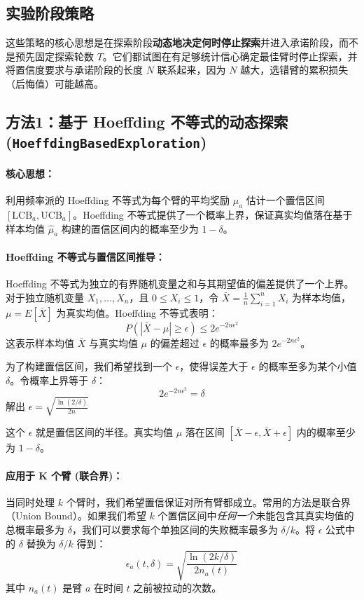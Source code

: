 \documentclass[8pt, a4paper]{ctexart} %
\begin{document}
\subsection{实验阶段策略}

这些策略的核心思想是在探索阶段\textbf{动态地决定何时停止探索}并进入承诺阶段，而不是预先固定探索轮数 $T$。它们都试图在有足够统计信心确定最佳臂时停止探索，并将置信度要求与承诺阶段的长度 $N$ 联系起来，因为 $N$ 越大，选错臂的累积损失（后悔值）可能越高。

\subsection{方法1：基于 Hoeffding 不等式的动态探索 (\texttt{HoeffdingBasedExploration})}

\paragraph{核心思想：} 利用频率派的 Hoeffding 不等式为每个臂的平均奖励 $\mu_a$ 估计一个置信区间 $[\text{LCB}_a, \text{UCB}_a]$。Hoeffding 不等式提供了一个概率上界，保证真实均值落在基于样本均值 $\hat{\mu}_a$ 构建的置信区间内的概率至少为 $1-\delta$。

\paragraph{Hoeffding 不等式与置信区间推导：}
Hoeffding 不等式为独立的有界随机变量之和与其期望值的偏差提供了一个上界。对于独立随机变量 $X_1, \dots, X_n$，且 $0 \le X_i \le 1$，令 $\bar{X} = \frac{1}{n}\sum_{i=1}^n X_i$ 为样本均值，$\mu = E[\bar{X}]$ 为真实均值。Hoeffding 不等式表明：
$$P(|\bar{X} - \mu| \ge \epsilon) \le 2e^{-2n\epsilon^2}$$
这表示样本均值 $\bar{X}$ 与真实均值 $\mu$ 的偏差超过 $\epsilon$ 的概率最多为 $2e^{-2n\epsilon^2}$。

为了构建置信区间，我们希望找到一个 $\epsilon$，使得误差大于 $\epsilon$ 的概率至多为某个小值 $\delta$。令概率上界等于 $\delta$：
$$2e^{-2n\epsilon^2} = \delta$$
解出 $\epsilon= \sqrt{\frac{\ln(2/\delta)}{2n}}$

这个 $\epsilon$ 就是置信区间的半径。真实均值 $\mu$ 落在区间 $[\bar{X} - \epsilon, \bar{X} + \epsilon]$ 内的概率至少为 $1-\delta$。

\paragraph{应用于 K 个臂 (联合界)：}
当同时处理 $k$ 个臂时，我们希望置信保证对所有臂都成立。常用的方法是联合界（Union Bound）。如果我们希望 $k$ 个置信区间中\emph{任何一个}未能包含其真实均值的总概率最多为 $\delta$，我们可以要求每个单独区间的失败概率最多为 $\delta/k$。将 $\epsilon$ 公式中的 $\delta$ 替换为 $\delta/k$ 得到：
$$\epsilon_a(t, \delta) = \sqrt{\frac{\ln(2k/\delta)}{2n_a(t)}}$$
其中 $n_a(t)$ 是臂 $a$ 在时间 $t$ 之前被拉动的次数。
\end{document}
